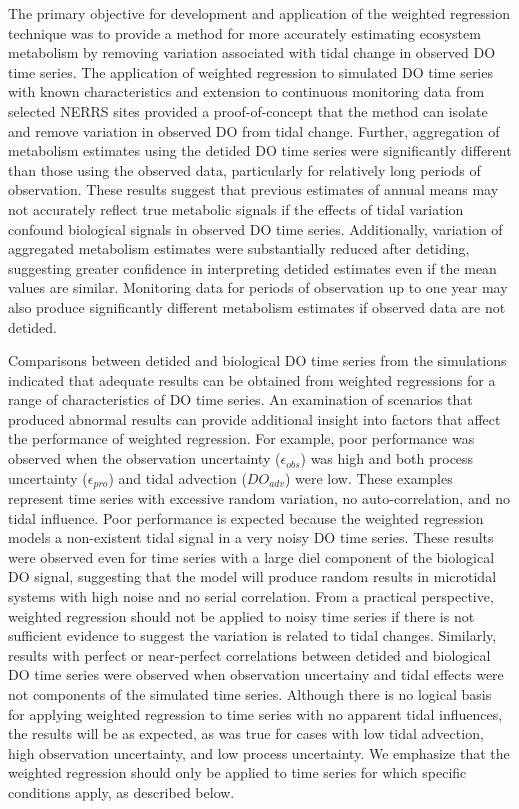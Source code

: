 \documentclass[letterpaper,12pt,oneside]{article}\usepackage[]{graphicx}\usepackage[]{color}
\begin{document}
The primary objective for development and application of the weighted regression technique was to provide a method for more accurately estimating ecosystem metabolism by removing variation associated with tidal change in observed \ac{DO} time series.  The application of weighted regression to simulated \ac{DO} time series with known characteristics and extension to continuous monitoring data from selected \ac{NERRS} sites provided a proof-of-concept that the method can isolate and remove variation in observed \ac{DO} from tidal change.  Further, aggregation of metabolism estimates using the detided \ac{DO} time series were significantly different than those using the observed data, particularly for relatively long periods of observation. These results suggest that previous estimates of annual means may not accurately reflect true metabolic signals if the effects of tidal variation confound biological signals in observed \ac{DO} time series.  Additionally, variation of aggregated metabolism estimates were substantially reduced after detiding, suggesting greater confidence in interpreting detided estimates even if the mean values are similar.  Monitoring data for periods of observation up to one year may also produce significantly different metabolism estimates if observed data are not detided. 

Comparisons between detided and biological \ac{DO} time series from the simulations indicated that adequate results can be obtained from weighted regressions for a range of characteristics of \ac{DO} time series.  An examination of scenarios that produced abnormal results can provide additional insight into factors that affect the performance of weighted regression.  For example, poor performance was observed when the observation uncertainty ($\epsilon_{obs}$) was high and both process uncertainty ($\epsilon_{pro}$) and tidal advection ($DO_{adv}$) were low.  These examples represent time series with excessive random variation, no auto-correlation, and no tidal influence.  Poor performance is expected because the weighted regression models a non-existent tidal signal in a very noisy \ac{DO} time series.  These results were observed even for time series with a large diel component of the biological \ac{DO} signal, suggesting that the model will produce random results in microtidal systems with high noise and no serial correlation.  From a practical perspective, weighted regression should not be applied to noisy time series if there is not sufficient evidence to suggest the variation is related to tidal changes.  Similarly, results with perfect or near-perfect correlations between detided and biological \ac{DO} time series were observed when observation uncertainy and tidal effects were not components of the simulated time series.  Although there is no logical basis for applying weighted regression to time series with no apparent tidal influences, the results will be as expected, as was true for cases with low tidal advection, high observation uncertainty, and low process uncertainty.  We emphasize that the weighted regression should only be applied to time series for which specific conditions apply, as described below.  
\end{document}
